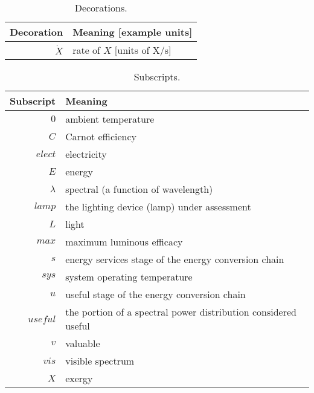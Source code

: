   
\begin{table}
\centering %
\caption{Decorations.}
\begin{tabular}{r l}
\toprule
Decoration & Meaning [example units] \\
\midrule
$\dot{X}$ & rate of $X$ [units of X/s] \\
\bottomrule
\end{tabular}
\label{tab:decorations}
\end{table}


  
\begin{table}
\centering
\caption{Subscripts.}
\begin{tabular}{r l}
\toprule
Subscript & Meaning \\
\midrule
$0$ & ambient temperature \\
$C$ & Carnot efficiency \\
$elect$ & electricity \\
$E$ & energy \\
$\lambda$ & spectral (a function of wavelength) \\
$lamp$ & the lighting device (lamp) under assessment \\
$L$ & light \\
$max$ & maximum luminous efficacy \\
$s$ & energy services stage of the energy conversion chain \\
$sys$ & system operating temperature \\
$u$ & useful stage of the energy conversion chain \\
$useful$ & the portion of a spectral power distribution considered useful \\
$v$ & valuable \\
$vis$ & visible spectrum \\
$X$ & exergy \\
\bottomrule
\end{tabular}
\label{tab:subscripts}
\end{table}


